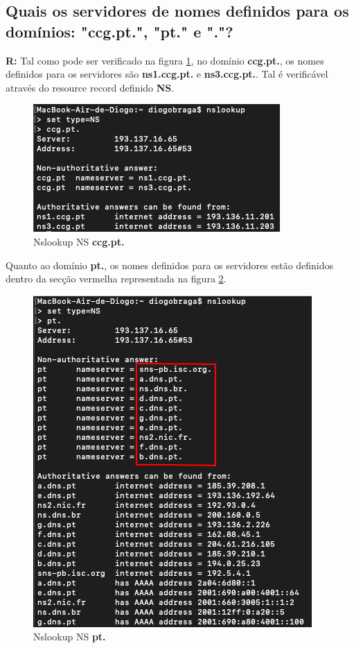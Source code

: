\documentclass{llncs}
\begin{document}
\subsection{\textbf{Quais os servidores de nomes definidos para os domínios: "ccg.pt.", "pt." e "."?}}
\textbf{R:} Tal como pode ser verificado na figura \ref{fig:31}, no domínio \textbf{ccg.pt.}, os nomes definidos para os servidores são \textbf{ns1.ccg.pt.} e \textbf{ns3.ccg.pt.}. Tal é verificável através do resource record definido \textbf{NS}.

\begin{figure}[H]
\begin{center}
\includegraphics[scale=0.6]{3_1.png}
\end{center}
\caption{\label{fig:31}Nslookup NS \textbf{ccg.pt.}}
\end{figure}


\newpage

Quanto ao domínio \textbf{pt.}, os nomes definidos para os servidores estão definidos dentro da secção vermelha representada na figura \ref{fig:32}.

\begin{figure}[H]
\begin{center}
\includegraphics[scale=0.6]{3_2.png}
\end{center}
\caption{\label{fig:32}Nslookup NS \textbf{pt.}}
\end{figure}
\end{document}
